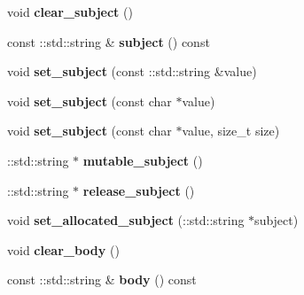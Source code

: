 \begin{DoxyCompactItemize}
\item 
\mbox{\label{classtbMessages_1_1Message_afb805774a419c843bf7d94c5e9692010}} 
void {\bfseries clear\+\_\+subject} ()
\item 
\mbox{\label{classtbMessages_1_1Message_a45a9af2399d1750ce7bf05862ce20c10}} 
const \+::std\+::string \& {\bfseries subject} () const
\item 
\mbox{\label{classtbMessages_1_1Message_a5d4b14ed2651a546863eb7ffcc51fcbf}} 
void {\bfseries set\+\_\+subject} (const \+::std\+::string \&value)
\item 
\mbox{\label{classtbMessages_1_1Message_a48e81daf39b20e879b7a8b7c24fed362}} 
void {\bfseries set\+\_\+subject} (const char $\ast$value)
\item 
\mbox{\label{classtbMessages_1_1Message_a4a3b99da03ef67016450e7926142f3f3}} 
void {\bfseries set\+\_\+subject} (const char $\ast$value, size\+\_\+t size)
\item 
\mbox{\label{classtbMessages_1_1Message_a23c55396808ea599d8fde3d7201cc93d}} 
\+::std\+::string $\ast$ {\bfseries mutable\+\_\+subject} ()
\item 
\mbox{\label{classtbMessages_1_1Message_a9f7a85d28273328b8731586caaddd761}} 
\+::std\+::string $\ast$ {\bfseries release\+\_\+subject} ()
\item 
\mbox{\label{classtbMessages_1_1Message_a3588a77665194b754a676dda0288cb50}} 
void {\bfseries set\+\_\+allocated\+\_\+subject} (\+::std\+::string $\ast$subject)
\item 
\mbox{\label{classtbMessages_1_1Message_a8990b8ebf2a40201bbc72acd3e898c58}} 
void {\bfseries clear\+\_\+body} ()
\item 
\mbox{\label{classtbMessages_1_1Message_a16bc2495b8b18e6b696a3ceeac7072a3}} 
const \+::std\+::string \& {\bfseries body} () const
\item 

\end{DoxyCompactItemize}

